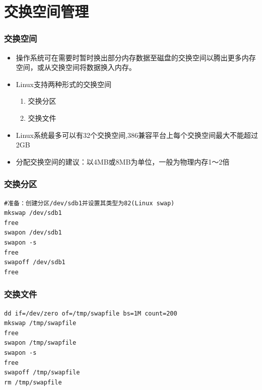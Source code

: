 \documentclass[xcolor=svgnames,presentation]{beamer}
\begin{document}
\section{交换空间管理}
\label{sec-3}
\begin{frame}
\frametitle{交换空间}
\label{sec-3-1}
\begin{itemize}

\item 操作系统可在需要时暂时换出部分内存数据至磁盘的交换空间以腾出更多内存空间，或从交换空间将数据换入内存。
\label{sec-3-1-1}%

\item Linux支持两种形式的交换空间
\label{sec-3-1-2}%
\begin{enumerate}
\item 交换分区
\item 交换文件
\end{enumerate}

\item Linux系统最多可以有32个交换空间,386兼容平台上每个交换空间最大不能超过2GB
\label{sec-3-1-3}%

\item 分配交换空间的建议：以4MB或8MB为单位，一般为物理内存1～2倍
\label{sec-3-1-4}%
\end{itemize} %
\end{frame}
\begin{frame}[fragile]
\frametitle{交换分区}
\label{sec-3-2}


\begin{verbatim}
#准备：创建分区/dev/sdb1并设置其类型为82(Linux swap)
mkswap /dev/sdb1
free
swapon /dev/sdb1
swapon -s
free
swapoff /dev/sdb1
free
\end{verbatim}
\end{frame}
\begin{frame}[fragile]
\frametitle{交换文件}
\label{sec-3-3}


\begin{verbatim}
dd if=/dev/zero of=/tmp/swapfile bs=1M count=200
mkswap /tmp/swapfile
free
swapon /tmp/swapfile
swapon -s
free
swapoff /tmp/swapfile
rm /tmp/swapfile
\end{verbatim}
\end{frame}
\end{document}
